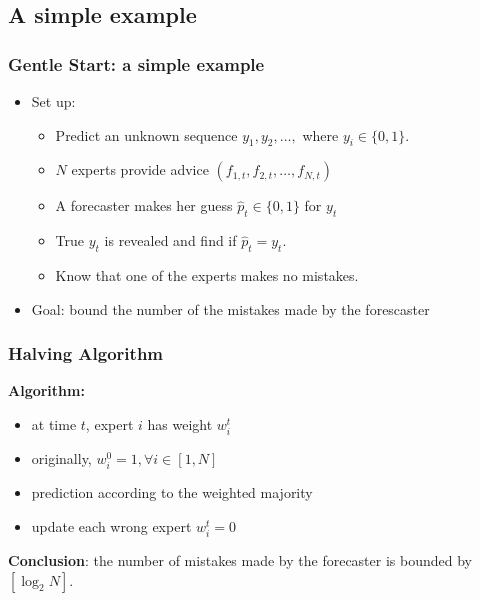 \documentclass{beamer}
\begin{document}
\subsection{A simple example}
\begin{frame}
\frametitle{Gentle Start: a simple example}
\begin{itemize}
\item Set up:
\begin{itemize}
\item Predict an unknown sequence $y_1, y_2, \ldots,$ where $y_i\in\{0,1\}.$
\item $N$ experts provide advice $(f_{1,t},f_{2,t},\ldots, f_{N,t})$
\item A forecaster makes her guess $\hat{p}_t\in\{0,1\}$ for $y_t$ 
\item True $y_t$ is revealed and find if $\hat{p}_t = y_t$. 
\item Know that one of the experts makes no mistakes.
\end{itemize}
\item Goal: bound the number of the mistakes made by the forescaster
\end{itemize}
\end{frame}

\begin{frame}
\frametitle{Halving Algorithm}
{\bf Algorithm:}
\begin{itemize}
\item at time $t$, expert $i$ has weight $w_i^t$
\item originally, $w_i^0 = 1, \forall i\in[1,N]$
\item prediction according to the weighted majority 
\item update each wrong expert   $w_i^t = 0$
\end{itemize}
{\bf Conclusion}: the number of mistakes made by the forecaster is bounded by {\color{red}$[\log_2 N]$}.
\end{frame}
\end{document}
